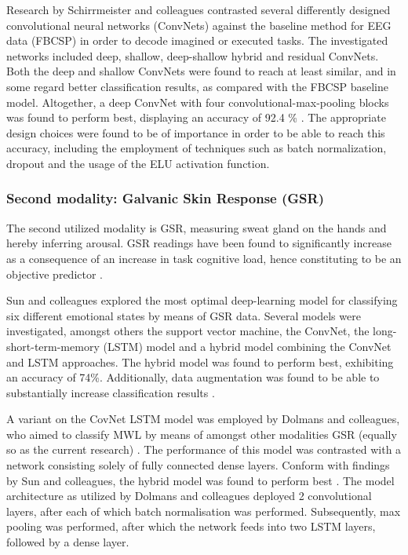 \documentclass{article}
\begin{document}
Research by Schirrmeister and colleagues contrasted several differently designed convolutional neural networks (ConvNets) against the baseline method for EEG data (FBCSP) in order to decode imagined or executed tasks. The investigated networks included deep, shallow, deep-shallow hybrid and residual ConvNets. Both the deep and shallow ConvNets were found to reach at least similar, and in some regard better classification results, as compared with the FBCSP baseline model. Altogether, a deep ConvNet with four convolutional-max-pooling blocks was found to perform best, displaying an accuracy of 92.4 \% \cite{schirrmeister2017deep}. The appropriate design choices were found to be of importance in order to be able to reach this accuracy, including the employment of techniques such as batch normalization, dropout and the usage of the ELU activation function.

\subsubsection{Second modality: Galvanic Skin Response (GSR)}
The second utilized modality is GSR, measuring sweat gland on the hands and hereby inferring arousal. GSR readings have been found to significantly increase as a consequence of an increase in task cognitive load, hence constituting to be an objective predictor \cite{shi2007galvanic}. 

Sun and colleagues explored the most optimal deep-learning model for classifying six different emotional states by means of GSR data. Several models were investigated, amongst others the support vector machine, the ConvNet, the long-short-term-memory (LSTM) model and a hybrid model combining the ConvNet and LSTM approaches. The hybrid model was found to perform best, exhibiting an accuracy of 74\%. Additionally, data augmentation was found to be able to substantially increase classification results \cite{sun2019hybrid}. 

A variant on the CovNet LSTM model was employed by Dolmans and colleagues, who aimed to classify MWL by means of amongst other modalities GSR (equally so as the current research) \cite{dolmans2020perceived}. The performance of this model was contrasted with a network consisting solely of fully connected dense layers. Conform with findings by Sun and colleagues, the hybrid model was found to perform best \cite{dolmans2020perceived}. The model architecture as utilized by Dolmans and colleagues deployed 2 convolutional layers, after each of which batch normalisation was performed. Subsequently, max pooling was performed, after which the network feeds into two LSTM layers, followed by a dense layer.
\end{document}
